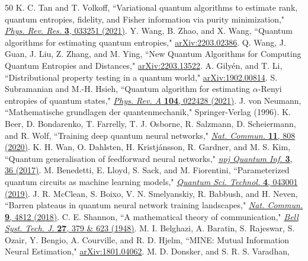 \documentclass[aps,groupedaddress,superscriptaddress,amssymb,amsmath,amsbsy,amsfonts,twocolumn,pra]{revtex4}
\begin{document}
\begin{thebibliography}{50}
K. C. Tan and T. Volkoff,
``Variational quantum algorithms to estimate rank, quantum entropies, fidelity, and Fisher information via purity minimization,"
\href{http://dx.doi.org/10.1103/PhysRevResearch.3.033251}{
{\it Phys. Rev. Res.} \textbf{3}, 033251 (2021)}.
%
Y. Wang, B. Zhao, and X. Wang,
``Quantum algorithms for estimating quantum entropies,"
\href{https://doi.org/10.48550/arXiv.2203.02386}{
arXiv:2203.02386}.
%
Q. Wang, J. Guan, J. Liu, Z. Zhang, and M. Ying,
``New Quantum Algorithms for Computing Quantum Entropies and Distances,"
\href{https://doi.org/10.48550/arXiv.2203.13522}{
arXiv:2203.13522}.
%
A. Gily\'{e}n, and T. Li,
``Distributional property testing in a quantum world,"
\href{https://doi.org/10.48550/arXiv.1902.00814}{
arXiv:1902.00814}.
%
S. Subramanian and M.-H. Hsieh,
``Quantum algorithm for estimating $\alpha$-Renyi entropies of quantum states,"
\href{http://dx.doi.org/10.1103/PhysRevA.104.022428}{
{\it Phys. Rev. A} \textbf{104}, 022428 (2021)}. 
%
J. von Neumann,
``Mathematische grundlagen der quantenmechanik,"
Springer-Verlag (1996).
%
K. Beer, D. Bondarenko, T. Farrelly, T. J. Osborne, R. Salzmann, D. Scheiermann, and R. Wolf,
``Training deep quantum neural networks," 
\href{http://dx.doi.org/10.1038/s41467-020-14454-2}{
{\it Nat. Commun.} \textbf{11}, 808 (2020)}.
%
K. H. Wan, O. Dahlsten, H. Kristj\'{a}nsson, R. Gardner, and M. S. Kim,
``Quantum generalisation of feedforward neural networks," 
\href{http://dx.doi.org/10.1038/s41534-017-0032-4}{
{\it npj Quantum Inf.} \textbf{3}, 36 (2017)}.
%
M. Benedetti, E. Lloyd, S. Sack, and M. Fiorentini,
``Parameterized quantum circuits as machine learning models," 
\href{http://dx.doi.org/10.1088/2058-9565/ab4eb5}{
{\it Quantum Sci. Technol.} \textbf{4}, 043001 (2019)}.
%
J. R. McClean, S. Boixo, V. N. Smelyanskiy, R. Babbush, and H. Neven,
``Barren plateaus in quantum neural network training landscapes," 
\href{http://dx.doi.org/10.1038/s41467-018-07090-4}{
{\it Nat. Commun.} \textbf{9}, 4812 (2018)}.
%
C. E. Shannon,
``A mathematical theory of communication,"
\href{http://dx.doi.org/10.1002/j.1538-7305.1948.tb01338.x}{
{\it Bell Syst. Tech. J.} \textbf{27}, 379 \& 623 (1948)}.
%
M. I. Belghazi, A. Baratin, S. Rajeswar, S. Ozair, Y. Bengio, A. Courville, and R. D. Hjelm,
``MINE: Mutual Information Neural Estimation,"
\href{https://doi.org/10.48550/arXiv.1801.04062}{
arXiv:1801.04062}.
%
M. D. Donsker, and S. R. S. Varadhan,

\end{thebibliography}
\end{document}
